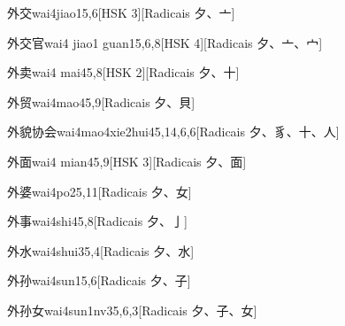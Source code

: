 \begin{entry}{外交}{wai4jiao1}{5,6}[HSK 3][Radicais ⼣、⼇]
\end{entry}

\begin{entry}{外交官}{wai4 jiao1 guan1}{5,6,8}[HSK 4][Radicais ⼣、⼇、⼧]
\end{entry}

\begin{entry}{外卖}{wai4 mai4}{5,8}[HSK 2][Radicais ⼣、⼗]
\end{entry}

\begin{entry}{外贸}{wai4mao4}{5,9}[Radicais ⼣、⾙]
\end{entry}

\begin{entry}{外貌协会}{wai4mao4xie2hui4}{5,14,6,6}[Radicais ⼣、⾘、⼗、⼈]
\end{entry}

\begin{entry}{外面}{wai4 mian4}{5,9}[HSK 3][Radicais ⼣、⾯]
\end{entry}

\begin{entry}{外婆}{wai4po2}{5,11}[Radicais ⼣、⼥]
\end{entry}

\begin{entry}{外事}{wai4shi4}{5,8}[Radicais ⼣、⼅]
\end{entry}

\begin{entry}{外水}{wai4shui3}{5,4}[Radicais ⼣、⽔]
\end{entry}

\begin{entry}{外孙}{wai4sun1}{5,6}[Radicais ⼣、⼦]
\end{entry}

\begin{entry}{外孙女}{wai4sun1nv3}{5,6,3}[Radicais ⼣、⼦、⼥]
\end{entry}

